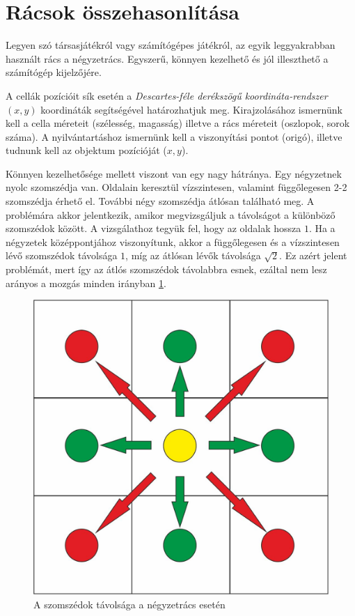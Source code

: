 

\section{Rácsok összehasonlítása}

Legyen szó társasjátékról vagy számítógépes játékról, az egyik leggyakrabban használt rács a négyzetrács. Egyszerű, könnyen kezelhető és jól illeszthető a számítógép kijelzőjére.

A cellák pozícióit sík esetén a \textit{Descartes-féle derékszögű koordináta-rendszer} $(x, y)$ koordináták segítségével határozhatjuk meg.
Kirajzolásához ismernünk kell a cella méreteit (szélesség, magasság) illetve a rács méreteit (oszlopok, sorok száma). 
A nyilvántartáshoz ismernünk kell a viszonyítási pontot (origó), illetve tudnunk kell az objektum pozícióját ($x, y$).

Könnyen kezelhetősége mellett viszont van egy nagy hátránya. Egy négyzetnek nyolc szomszédja van. Oldalain keresztül vízszintesen, valamint függőlegesen 2-2 szomszédja érhető el. További négy szomszédja átlósan található meg. A problémára akkor jelentkezik, amikor megvizsgáljuk a távolságot a különböző szomszédok között. A vizsgálathoz tegyük fel, hogy az oldalak hossza $1$. Ha a négyzetek középpontjához viszonyítunk, akkor a függőlegesen és a vízszintesen lévő szomszédok távolsága $1$, míg az átlósan lévők távolsága $\sqrt{2}$. Ez azért jelent problémát, mert így az átlós szomszédok távolabbra esnek, ezáltal nem lesz arányos a mozgás minden irányban \ref{fig:SqDistance}.

\begin{figure}[h!]
\centering
\includegraphics[scale=0.4]{kepek/SqDistance.jpg}
\caption{A szomszédok távolsága a négyzetrács esetén}
\label{fig:SqDistance}
\end{figure}


